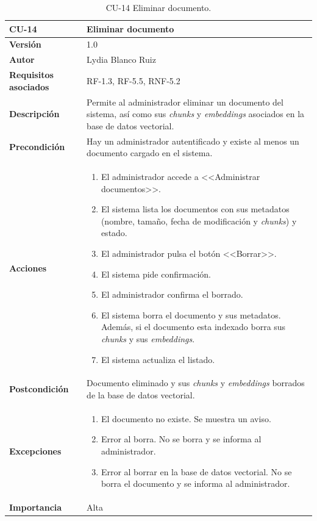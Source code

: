 \begin{table}[p]
	\centering
	\begin{tabularx}{\linewidth}{ p{} p{} }
		\toprule
		\textbf{CU-14}    & \textbf{Eliminar documento}\\
		\toprule
		\textbf{Versión}              & 1.0    \\
		\textbf{Autor}                & Lydia Blanco Ruiz \\
		\textbf{Requisitos asociados} & RF-1.3, RF-5.5, RNF-5.2 \\
		\textbf{Descripción}          & Permite al administrador eliminar un documento del sistema, así como sus \textit{chunks} y \textit{embeddings} asociados en la base de datos vectorial. \\
		\textbf{Precondición}         & Hay un administrador autentificado y existe al menos un documento cargado en el sistema. \\
		\textbf{Acciones}             &
		\begin{enumerate}
			\def\labelenumi{\arabic{enumi}.}
			\tightlist
			\item El administrador accede a <<Administrar documentos>>.
			\item El sistema lista los documentos con sus metadatos (nombre, tamaño, fecha de modificación y \textit{chunks}) y estado.
			\item El administrador pulsa el botón <<Borrar>>.
			\item El sistema pide confirmación.
			\item El administrador confirma el borrado.
			\item El sistema borra el documento y sus metadatos. Además, si el documento esta indexado borra sus \textit{chunks} y sus \textit{embeddings}.
			\item El sistema actualiza el listado.
		\end{enumerate}\\
		\textbf{Postcondición}        & Documento eliminado y sus \textit{chunks} y \textit{embeddings} borrados de la base de datos vectorial. \\
		\textbf{Excepciones}          & 
		\begin{enumerate}
			\def\labelenumi{\arabic{enumi}.}
			\tightlist
			\item El documento no existe. Se muestra un aviso. 
			\item Error al borra. No se borra y se informa al administrador.
			\item Error al borrar en la base de datos vectorial. No se borra el documento y se informa al administrador.
		\end{enumerate}\\
		\textbf{Importancia}          & Alta  \\
		\bottomrule
	\end{tabularx}
	\caption{CU-14 Eliminar documento.}
\end{table}

